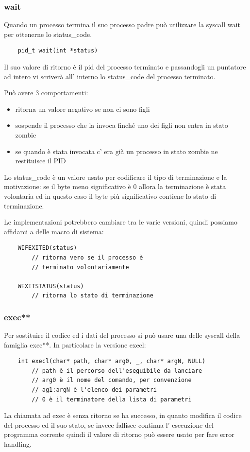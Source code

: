 \subsubsection{wait}
Quando un processo termina il suo processo padre può utilizzare la syscall wait per ottenerne lo status\_code.
\begin{verbatim}
    pid_t wait(int *status)
\end{verbatim}
Il suo valore di ritorno è il pid del processo terminato e passandogli un puntatore ad intero vi scriverà all' interno lo status\_code del processo terminato.

Può avere 3 comportamenti:
\begin{itemize}
    \item ritorna un valore negativo se non ci sono figli

    \item sospende il processo che la invoca finché uno dei figli non entra in stato zombie

    \item se quando è stata invocata c' era già un processo in stato zombie ne restituisce il PID
\end{itemize}

Lo status\_code è un valore usato per codificare il tipo di terminazione e la motivazione: se il byte meno significativo è 0 allora la terminazione è stata volontaria ed in questo caso il byte più significativo contiene lo stato di terminazione.

Le implementazioni potrebbero cambiare tra le varie versioni, quindi possiamo affidarci a delle macro di sistema:
\begin{verbatim}
    WIFEXITED(status)
        // ritorna vero se il processo è
        // terminato volontariamente
    
    WEXITSTATUS(status)
        // ritorna lo stato di terminazione
\end{verbatim}

\subsubsection{exec**}
Per sostituire il codice ed i dati del processo si può usare una delle syscall della famiglia exec**.
In particolare la versione execl:
\begin{verbatim}
    int execl(char* path, char* arg0, _, char* argN, NULL)
        // path è il percorso dell'eseguibile da lanciare
        // arg0 è il nome del comando, per convenzione
        // ag1:argN è l'elenco dei parametri
        // 0 è il terminatore della lista di parametri
\end{verbatim}
La chiamata ad exec è senza ritorno se ha successo, in quanto modifica il codice del processo ed il suo stato, se invece fallisce continua l' esecuzione del programma corrente quindi il valore di ritorno può essere usato per fare error handling.

